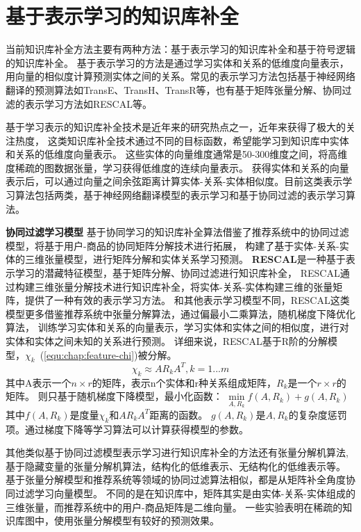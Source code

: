 \section{基于表示学习的知识库补全}
\label{cha:presentation}

当前知识库补全方法主要有两种方法：基于表示学习的知识库补全和基于符号逻辑的知识库补全。
基于表示学习的方法是通过学习实体和关系的低维度向量表示，
用向量的相似度计算预测实体之间的关系。常见的表示学习方法包括基于神经网络翻译的预测算法如TransE\cite{NIPS2013_5071}、TransH\cite{Wang2014KnowledgeGE}、TransR\cite{Huang2017ImprovedKB}等，也有基于矩阵张量分解、协同过滤的表示学习方法如RESCAL\cite{Nickel2011}等。

基于学习表示的知识库补全技术是近年来的研究热点之一，近年来获得了极大的关注热度，
这类知识库补全技术通过不同的目标函数，希望能学习到知识库中实体和关系的低维度向量表示。
这些实体的向量维度通常是50-300维度之间，将高维度稀疏的图数据张量，学习获得低维度的连续向量表示。
获得实体和关系的向量表示后，可以通过向量之间余弦距离计算实体-关系-实体相似度。目前这类表示学习算法包括两类，基于神经网络翻译模型的表示学习和基于协同过滤的表示学习算法。

\textbf{协同过滤学习模型} 基于协同学习的知识库补全算法借鉴了推荐系统中的协同过滤模型，将基于用户-商品的协同矩阵分解技术进行拓展，
构建了基于实体-关系-实体的三维张量模型，进行矩阵分解和实体关系学习预测。
\textbf{RESCAL}是一种基于表示学习的潜藏特征模型，基于矩阵分解、协同过滤进行知识库补全，
RESCAL通过构建三维张量分解技术进行知识库补全，将实体-关系-实体构建三维的张量矩阵，提供了一种有效的表示学习方法。
和其他表示学习模型不同，RESCAL这类模型更多借鉴推荐系统中张量分解算法，通过偏最小二乘算法，随机梯度下降优化算法，
训练学习实体和关系的向量表示，学习实体和实体之间的相似度，进行对实体和实体之间未知的关系进行预测。
详细来说，RESCAL基于R阶的分解模型，$\chi_k$~(\ref{equ:chap:feature-chi})被分解。
\begin{equation}
\label{equ:chap:feature-chi}
\chi_k \approx AR_{k}A^T, k =1...m
\end{equation}
其中A表示一个$n\times r$的矩阵，表示n个实体和r种关系组成矩阵，$R_{k}$是一个$r\times r$的矩阵。
则只基于随机梯度下降模型，最小化函数：
$\min \limits_{A,R_k} f(A,R_k)+g(A,R_k)$
其中$f(A,R_k)$是度量$\chi_k$和$AR_{k}A^T$距离的函数。
$g(A,R_k)$是$A,R_k$的复杂度惩罚项。通过梯度下降等学习算法可以计算获得模型的参数。

其他类似基于协同过滤模型表示学习进行知识库补全的方法还有张量分解机算法\cite{Rendle2010FactorizationM},
基于隐藏变量的张量分解机算法\cite{Rendle2012FactorizationMW}，结构化的低维表示\cite{2009EmbeddingLS}、无结构化的低维表示等。
基于张量分解模型和推荐系统等领域的协同过滤算法相似，都是从矩阵补全角度协同过滤学习向量模型。
不同的是在知识库中，矩阵其实是由实体-关系-实体组成的三维张量，而推荐系统中的用户-商品矩阵是二维向量。
一些实验\cite{Dong2014}表明在稀疏的知识库图中，使用张量分解模型有较好的预测效果。

